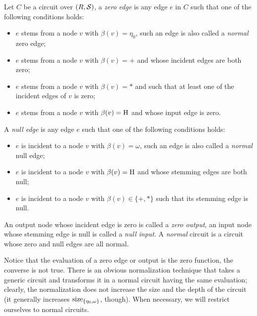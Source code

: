 \begin{definition}
  Let $C$ be a circuit over $(R,\mathcal{S})$, a
  \emph{zero edge} is any edge $e$ in $C$ such that
  one of the following conditions holds:
  \begin{itemize}
  \item $e$ stems from a node $v$ with $\beta(v)=\eta_0$, such an edge
    is also called a \emph{normal} zero edge;
  \item $e$ stems from a node $v$ with $\beta(v)=+$ and whose incident
    edges are both zero;
  \item $e$ stems from a node $v$ with $\beta(v)=*$ and such that at
    least one of the incident edges of $v$ is zero;
  \item $e$ stems from a node $v$ with $\beta(v)=\operatorname{H}$ and whose input
    edge is zero.
  \end{itemize}
  A \emph{null edge} is any edge $e$ such that one of
  the following conditions holds:
  \begin{itemize}
  \item $e$ is incident to a node $v$ with $\beta(v)=\omega$, such an
    edge is also called a \emph{normal} null edge;
  \item $e$ is incident to a node $v$ with $\beta(v)=\operatorname{H}$ and whose
    stemming edges are both null;
  \item $e$ is incident to a node $v$ with $\beta(v)\in\{+,*\}$ such
    that its stemming edge is null.
  \end{itemize}
  An output node whose incident edge is zero is called a \emph{zero
    output}, an input node whose stemming edge is null is called a
  \emph{null input}.  A \emph{normal} circuit is a circuit whose zero
  and null edges are all normal.
\end{definition}

Notice that the evaluation of a zero edge or output is the zero
function, the converse is not true.  There is an obvious normalization
technique that takes a generic circuit and transforms it in a normal
circuit having the same evaluation; clearly, the normalization does
not increase the size and the depth of the circuit (it generally
increases $\operatorname{size}_{\{\eta_0,\omega\}}$, though). When necessary, we
will restrict ourselves to normal circuits.

